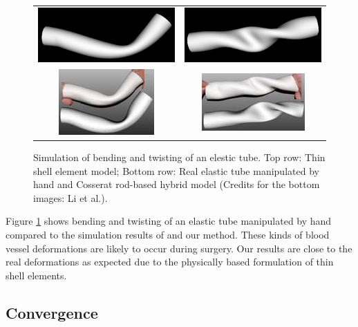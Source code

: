 \begin{figure}[tbh]
    \centering
    \begin{tabular}{cc}
     \includegraphics[width=0.3\columnwidth]{img/compare-bend.png}
      &
      \includegraphics[width=0.3\columnwidth]{img/compare-twist.png}
      \\
      \includegraphics[width=0.3\columnwidth]{img/compare-bend-other.png}
      &
      \includegraphics[width=0.3\columnwidth]{img/compare-twist-other.png}
    \end{tabular}
    \caption{Simulation of bending and twisting of an elestic tube. Top row: Thin shell element model; Bottom row: Real elastic tube manipulated by hand and Cosserat rod-based hybrid model\cite{Li2009} (Credits for the bottom images: Li et al.).}
    \label{fig-deformations}
\end{figure}

Figure \ref{fig-deformations} shows bending and twisting of an elastic tube manipulated by hand compared to the simulation results of \cite{Li2009} and our method. These kinds of blood vessel deformations are likely to occur during surgery. Our results are close to the real deformations as expected due to the physically based formulation of thin shell elements.

\subsection{Convergence}

